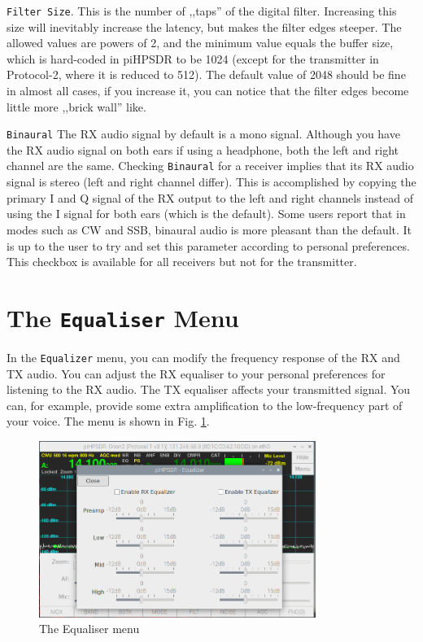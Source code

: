 \documentclass[12pt]{book}
\def\rett#1{\texttt{\color{red}#1}}
\def\bltt#1{\texttt{\color{blue}#1}}
\def\pH{pi\-HPSDR }
\begin{document}
\rett{Filter Size}. This is the number of ,,taps'' of the digital
filter. Increasing this size will inevitably increase the latency,
but makes the filter edges steeper. The allowed values are
powers of 2, and the minimum value equals the buffer size, which
is hard-coded in \pH to be 1024 (except for the transmitter in Protocol-2,
where it is reduced to 512). The default value of 2048 should be
fine in almost all cases, if you increase it, you can notice that
the filter edges become little more ,,brick wall'' like.

\rett{Binaural} The RX audio signal by default is a mono signal. Although
you have the RX audio signal on both ears if using a headphone, both the
left and right channel are the same. Checking \rett{Binaural} for a
receiver implies that its RX audio signal is stereo (left and right channel
differ). This is accomplished by copying the primary I and Q signal of the
RX output to the left and right channels instead of using the I signal
for both ears (which is the default). Some users report that in modes
such as CW and SSB, binaural audio is more pleasant than the default.
It is up to the user to try and set this parameter according to personal
preferences. This checkbox is available for all receivers but not for the
transmitter.

\section{The \texttt{Equaliser} Menu}

In the \bltt{Equalizer} menu, you can modify the frequency response of
the RX and TX audio. You can adjust the RX equaliser to your personal
preferences for listening to the RX audio. The TX equaliser affects
your transmitted signal. You can, for example, provide some extra
amplification to the low-frequency part of your voice. The menu
is shown in Fig. \ref{fig:EqualizerMenu}.

\begin{figure}[ht]
\center
\includegraphics[width=9cm]{EqualizerMenu.png}
\caption{The Equaliser menu}
\label{fig:EqualizerMenu}
\end{figure}
\end{document}
